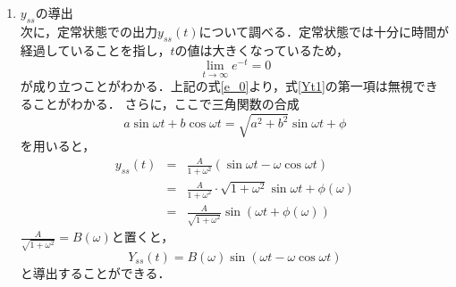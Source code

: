 \documentclass[a4paper,11pt]{jsarticle}
\begin{document}
\begin{enumerate}
\begin{equation}
\begin{aligned}
             & a + b = 0               \\
             & b + c = 0               \\
             & a\omega^2 + c = A\omega
          \end{aligned}
          \right.
          \label{abc}
        \end{equation}
        式\ref{abc}を解くと，$a=\frac{A\omega}{\omega^2+1}$，$b=-\frac{A\omega}{\omega^2+1}$，$\frac{A\omega}{\omega^2+1}$
        となる．よって$Y(s)$は，
        \begin{equation}
          Y(s) = \frac{A\omega}{(\omega^2+1)(s+1)} - \frac{A\omega s}{(\omega^2+1)(s^2+\omega^2)} + \frac{A\omega}{(\omega^2+1)(s^2+\omega^2)} \label{Ys3}
        \end{equation}
        式\ref{Ys3}を逆ラプラス変換を用いて$y(t)$の式に変換すると，
        \begin{eqnarray}
          y(t) &=& \mathcal{L}^{-1}[Y(s)] = \mathcal{L}^{-1}\left[\frac{A\omega}{(\omega^2+1)(s+1)}\right]-\mathcal{L}^{-1}\left[\frac{A\omega s}{(\omega^2+1)(s^2+\omega^2)}\right] + \mathcal{L}^{-1}\left[\frac{A\omega}{(\omega^2+1)(s^2+\omega^2)}\right] \nonumber \\
          &=&  \frac{A\omega}{\omega^2+1}\cdot e^{-t} - \frac{A\omega}{\omega^2+1}\cdot \cos{\omega t} + \frac{A}{\omega^2 + 1} \cdot \sin{\omega t} \nonumber \\
          &=& \frac{A\omega}{\omega^2+1}\cdot e^{-t} + \frac{A}{1+\omega^2}(\sin{\omega t}-\omega\cos{\omega t}) \label{Yt1}
        \end{eqnarray}

  \item $y_{ss}$の導出\\
        次に，定常状態での出力$y_{ss}(t)$について調べる．定常状態では十分に時間が経過していることを指し，$t$の値は大きくなっているため，
        \begin{equation}
          \lim_{t\rightarrow\infty}e^{-t}=0 \label{e_0}
        \end{equation}
        が成り立つことがわかる．上記の式\ref{e_0}より，式\ref{Yt1}の第一項は無視できることがわかる．
        さらに，ここで三角関数の合成
        \begin{equation}
          a\sin{\omega t}+b\cos{\omega t} = \sqrt{a^2+b^2}\sin{\omega t + \phi} \nonumber
        \end{equation}
        を用いると，
        \begin{eqnarray}
          y_{ss}(t) &=& \frac{A}{1+\omega^2}(\sin{\omega t}-\omega\cos{\omega t}) \nonumber \\
          &=& \frac{A}{1+\omega^2} \cdot \sqrt{1+\omega^2}\sin{\omega t + \phi(\omega)} \nonumber \\
          &=& \frac{A}{\sqrt{1+\omega^2}}\sin({\omega t + \phi(\omega)})
        \end{eqnarray}
        $\frac{A}{\sqrt{1+\omega^2}} = B(\omega)$と置くと，
        \begin{equation}
          Y_{ss}(t) = B(\omega)\sin{(\omega t - \omega \cos{\omega t})}
        \end{equation}
        と導出することができる．


\end{enumerate}
\end{document}

